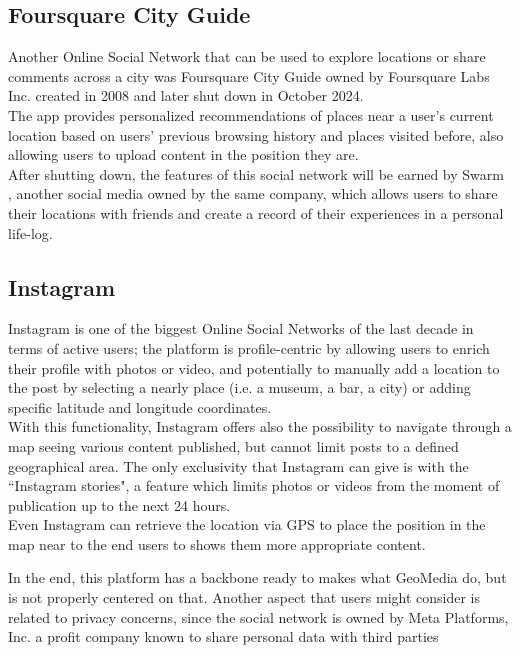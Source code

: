\documentclass[conference]{IEEEtran}
\begin{document}
\subsection{Foursquare City Guide}

Another Online Social Network that can be used to explore locations or share comments across a city was Foursquare City Guide\cite{FourSquareWiki} owned by Foursquare Labs Inc. \cite{FoursquareOfficialLink} created in 2008 and later shut down in October 2024.
\\
The app provides personalized recommendations of places near a user's current location based on users' previous browsing history and places visited before, also allowing users to upload content in the position they are.
\\
After shutting down, the features of this social network will be earned by Swarm \cite{FoursquareSwarm}, another social media owned by the same company, which allows users to share their locations with friends and create a record of their experiences in a personal life-log.

\subsection{Instagram}
Instagram \cite{Instagram} is one of the biggest Online Social Networks of the last decade in terms of active users; the platform is profile-centric by allowing users to enrich their profile with photos or video, and potentially to manually add a location to the post by selecting a nearly place (i.e. a museum, a bar, a city) or adding specific latitude and longitude coordinates.
\\
With this functionality, Instagram offers also the possibility to navigate through a map seeing various content published, but cannot limit posts to a defined geographical area.
The only exclusivity that Instagram can give is with the ``Instagram stories", a feature which limits photos or videos from the moment of publication up to the next 24 hours.
\\
Even Instagram can retrieve the location via GPS to place the position in the map near to the end users to shows them more appropriate content.

In the end, this platform has a backbone ready to makes what GeoMedia do, but is not properly centered on that. Another aspect that users might consider is related to privacy concerns, since the social network is owned by Meta Platforms, Inc. a profit company known to share personal data with third parties\cite{MetaPrivacy}
\end{document}
